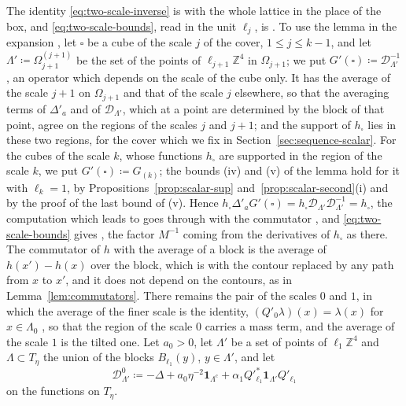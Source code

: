 \documentclass[11pt]{preprint}
\numberwithin{equation}{section}
\theoremstyle{definition}
\theoremstyle{remark}
\theoremstyle{plain}
\begin{document}
The identity \eqref{eq:two-scale-inverse} is \cite[(2.42)]{BalabanPRT2} with the whole lattice in the place of the box, and \eqref{eq:two-scale-bounds}, read in the unit $\ell_j$, is \cite[(2.43)]{BalabanPRT2}. To use the lemma in the expansion \cite[(2.37), (2.38)]{BalabanPRT2}, let $\square$ be a cube of the scale $j$ of the cover, $1 \leq j \leq k - 1$, and let $\Lambda' \coloneqq \Omega^{(j+1)}_{j+1}$ be the set of the points of $\ell_{j+1}\mathbb Z^4$ in $\Omega_{j+1}$; we put $G'(\square) \coloneqq \mathcal D_{\Lambda'}^{-1}$, an operator which depends on the scale of the cube only. It has the average of the scale $j + 1$ on $\Omega_{j+1}$ and that of the scale $j$ elsewhere, so that the averaging terms of $\Delta'_a$ and of $\mathcal D_{\Lambda'}$, which at a point are determined by the block of that point, agree on the regions of the scales $j$ and $j + 1$; and the support of $h_\square$ lies in these two regions, for the cover which we fix in Section~\ref{sec:sequence-scalar}. For the cubes of the scale $k$, whose functions $h_\square$ are supported in the region of the scale $k$, we put $G'(\square) \coloneqq G_{(k)}$; the bounds (iv) and (v) of the lemma hold for it with $\ell_k = 1$, by Propositions~\ref{prop:scalar-sup} and~\ref{prop:scalar-second}(i) and by the proof of the last bound of (v). Hence $h_\square\Delta'_aG'(\square) = h_\square\mathcal D_{\Lambda'}\mathcal D_{\Lambda'}^{-1} = h_\square$, the computation which leads to \cite[(2.38)]{BalabanPRT2} goes through with the commutator \cite[(2.39)]{BalabanPRT2}, and \eqref{eq:two-scale-bounds} gives \cite[(2.44)]{BalabanPRT2}, the factor $M^{-1}$ coming from the derivatives of $h_\square$ as there. The commutator of $h$ with the average of a block is the average of $h(x') - h(x)$ over the block, which is \cite[(2.39)]{BalabanPRT2} with the contour replaced by any path from $x$ to $x'$, and it does not depend on the contours, as in Lemma~\ref{lem:commutators}. There remains the pair of the scales $0$ and $1$, in which the average of the finer scale is the identity, $(Q'_0\lambda)(x) = \lambda(x)$ for $x \in \Lambda_0$ \cite[p.~225]{BalabanPRT2}, so that the region of the scale $0$ carries a mass term, and the average of the scale $1$ is the tilted one. Let $a_0 > 0$, let $\Lambda'$ be a set of points of $\ell_1\mathbb Z^4$ and $\Lambda \subset T_\eta$ the union of the blocks $B_{\ell_1}(y)$, $y \in \Lambda'$, and let
\begin{equation}\label{eq:first-scale-operator}
    \mathcal D^0_{\Lambda'} \coloneqq -\Delta + a_0\eta^{-2}\mathbf 1_{\Lambda^c} + \alpha_1Q'^*_{\ell_1}\mathbf 1_{\Lambda'}Q'_{\ell_1}
\end{equation}
on the functions on $T_\eta$.
\end{document}

